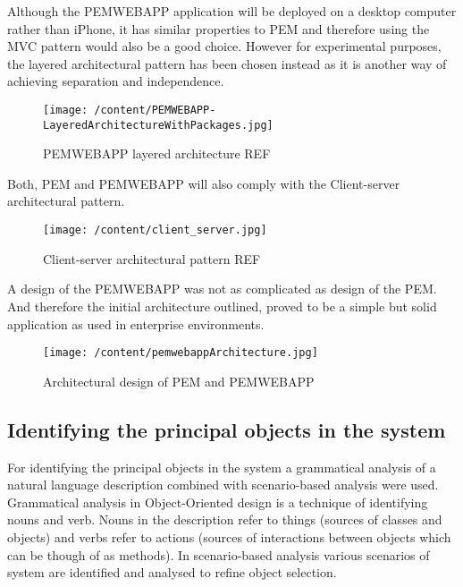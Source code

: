 \documentclass[12pt, a4paper]{report}   %
\begin{document}
\begin{enumerate}
Although the PEMWEBAPP application will be deployed on a desktop computer rather than iPhone, it has similar properties to PEM and therefore using the MVC pattern would also be a good choice. However for experimental purposes, the layered architectural pattern has been chosen instead as it is another way of achieving separation and independence.\\


\begin{figure}[H]
  \centering
	\texttt{[image: /content/PEMWEBAPP-LayeredArchitectureWithPackages.jpg]}
	  \caption{PEMWEBAPP layered architecture REF}
\end{figure}
 

Both, PEM and PEMWEBAPP will also comply with the Client-server architectural pattern. \\
 
 
\begin{figure}[H]
  \centering
	\texttt{[image: /content/client\_server.jpg]}
	  \caption{Client-server architectural pattern REF}
\end{figure}
 
 
A design of the PEMWEBAPP was not as complicated as design of the PEM. And therefore the initial architecture outlined, proved to be a simple but solid application as used in enterprise environments.


\begin{figure}[H]
\begin{sideways}
\begin{minipage}{19cm}
	\texttt{[image: /content/pemwebappArchitecture.jpg]}
	\caption{Architectural design of PEM and PEMWEBAPP}
\end{minipage}
\end{sideways}
\centering
\end{figure}
 

\clearpage
\subsection{Identifying the principal objects in the system}
For identifying the principal objects in the system a grammatical analysis of a natural language description combined with scenario-based analysis were used. Grammatical analysis in Object-Oriented design is a technique of identifying nouns and verb. Nouns in the description refer to things (sources of classes and objects) and verbs refer to actions (sources of interactions between objects which can be though of as methods). In scenario-based analysis various scenarios of system are identified and analysed to refine object selection.\\ \\



\end{enumerate}
\end{document}
